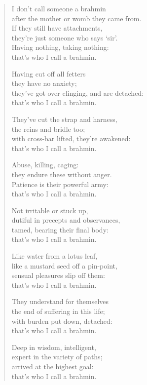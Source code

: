 \documentclass[12pt,openany]{book}%
\begin{document}
\begin{verse}
I don’t call someone a brahmin \\
after the mother or womb they came from. \\
If they still have attachments, \\
they’re just someone who says ‘sir’. \\
Having nothing, taking nothing: \\
that’s who I call a brahmin. 

Having cut off all fetters \\
they have no anxiety; \\
they’ve got over clinging, and are detached: \\
that’s who I call a brahmin. 

They’ve cut the strap and harness, \\
the reins and bridle too; \\
with cross-bar lifted, they’re awakened: \\
that’s who I call a brahmin. 

Abuse, killing, caging: \\
they endure these without anger. \\
Patience is their powerful army: \\
that’s who I call a brahmin. 

Not irritable or stuck up, \\
dutiful in precepts and observances, \\
tamed, bearing their final body: \\
that’s who I call a brahmin. 

Like water from a lotus leaf, \\
like a mustard seed off a pin-point, \\
sensual pleasures slip off them: \\
that’s who I call a brahmin. 

They understand for themselves \\
the end of suffering in this life; \\
with burden put down, detached: \\
that’s who I call a brahmin. 

Deep in wisdom, intelligent, \\
expert in the variety of paths; \\
arrived at the highest goal: \\
that’s who I call a brahmin. 


\end{verse}
\end{document}
